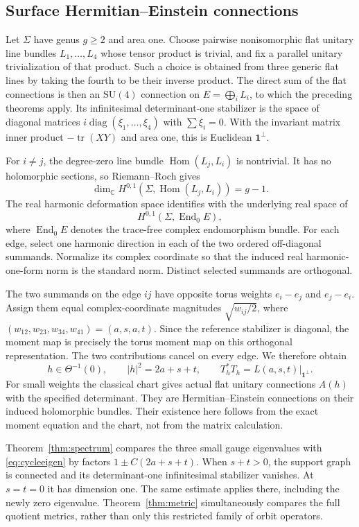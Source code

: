 \documentclass[11pt]{amsart}
\theoremstyle{definition}
\theoremstyle{remark}
\newcommand{\C}{\mathbb C}
\newcommand{\tr}{\operatorname{tr}}
\newcommand{\diag}{\operatorname{diag}}
\DeclareMathOperator{\End}{End}
\DeclareMathOperator{\Hom}{Hom}
\begin{document}
\subsection{Surface Hermitian--Einstein connections}
Let $\Sigma$ have genus $g\geq2$ and area one. Choose pairwise
nonisomorphic flat unitary line bundles $L_1,\ldots,L_4$ whose
tensor product is trivial, and fix a parallel unitary trivialization
of that product. Such a choice is obtained from three generic flat
lines by taking the fourth to be their inverse product. The direct
sum of the flat connections is then an $\mathrm{SU}(4)$ connection
on $E=\bigoplus_iL_i$, to which the preceding theorems apply. Its
infinitesimal determinant-one stabilizer is the space of diagonal
matrices $i\diag(\xi_1,\ldots,\xi_4)$ with
$\sum\xi_i=0$. With the invariant matrix inner product
$-\tr(XY)$ and area one, this is Euclidean $\mathbf1^\perp$.

For $i\ne j$, the degree-zero line bundle
$\Hom(L_j,L_i)$ is nontrivial. It has no holomorphic sections,
so Riemann--Roch gives
\[
 \dim_\C H^{0,1}(\Sigma,\Hom(L_j,L_i))=g-1.
\]
The real harmonic deformation space identifies with the underlying
real space of
\[
 H^{0,1}(\Sigma,\End_0 E),
\]
where $\End_0 E$
denotes the trace-free complex endomorphism bundle.
For each edge, select one harmonic direction in each of
the two ordered off-diagonal summands. Normalize its complex
coordinate so that the induced real harmonic-one-form norm is
the standard norm. Distinct selected summands are orthogonal.

The two summands on the edge $ij$ have opposite torus weights
$e_i-e_j$ and $e_j-e_i$. Assign them equal complex-coordinate
magnitudes $\sqrt{w_{ij}/2}$, where
$(w_{12},w_{23},w_{34},w_{41})=(a,s,a,t)$. Since the reference
stabilizer is diagonal, the moment map is precisely the torus
moment map on this orthogonal representation. The two
contributions cancel on every edge. We therefore obtain
\begin{equation}\label{eq:surfacecycle}
 h\in\Theta^{-1}(0),\qquad |h|^2=2a+s+t,\qquad
 T_h^*T_h=L(a,s,t)|_{\mathbf1^\perp}.
\end{equation}
For small weights the classical chart gives actual flat unitary
connections $A(h)$ with the specified determinant. They are
Hermitian--Einstein connections on their induced holomorphic
bundles. Their existence here follows from the exact moment
equation and the chart, not from the matrix calculation.

Theorem~\ref{thm:spectrum} compares the three small gauge
eigenvalues with \eqref{eq:cycleeigen} by factors
$1\pm C(2a+s+t)$. When $s+t>0$, the support graph is connected
and its determinant-one infinitesimal stabilizer vanishes. At
$s=t=0$ it has dimension one. The same estimate applies there,
including the newly zero eigenvalue. Theorem~\ref{thm:metric}
simultaneously compares the full quotient metrics, rather than
only this restricted family of orbit operators.
\end{document}

